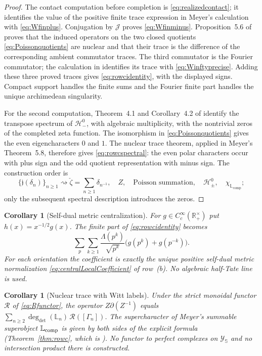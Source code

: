 \documentclass[11pt]{amsart}
\newtheorem{corollary}[theorem]{Corollary}
\theoremstyle{definition}
\theoremstyle{remark}
\newcommand{\R}{\mathbb R}
\begin{document}
\begin{proof}
The contact computation before completion is
\eqref{eq:realizedcontact}; it identifies the value of the positive finite
trace expression in Meyer's calculation with \eqref{eq:Wfinplus}.
Conjugation by
$\mathscr J$ proves \eqref{eq:Wfinminus}.  Proposition~5.6 of
\cite{MeyerZeta} proves that the induced operators on the two closed
quotients \eqref{eq:Poissonquotients} are nuclear and that their trace is
the difference of the corresponding ambient commutator traces.  The third
commutator is the Fourier commutator; the calculation in
\cite[Theorem~5.8 and its proof]{MeyerZeta} identifies its trace with
\eqref{eq:Winftyprecise}.  Adding these three proved traces gives
\eqref{eq:rowcidentity}, with the displayed signs.  Compact support handles
the finite sums and the Fourier finite part handles the unique
archimedean singularity.

For the second computation, Theorem~4.1 and Corollary~4.2 of
\cite{MeyerZeta} identify the transpose spectrum of $\mathcal H_-^0$, with
algebraic multiplicity, with the nontrivial zeros of the completed zeta
function.  The isomorphism in \eqref{eq:Poissonquotients} gives the even
eigencharacters $0$ and $1$.  The nuclear trace theorem, applied in
Meyer's Theorem~5.8, therefore gives \eqref{eq:rowcspectral}: the even polar
characters occur with plus sign and the odd quotient representation with
minus sign.  The construction order is
\[
 \{\mathfrak j(\delta_n)\}_{n\geq1}
 \rightsquigarrow\check\zeta=\sum_{n\geq1}\delta_{n^{-1}},\quad
 Z,\quad \text{Poisson summation},\quad
 \mathcal H_\pm^0,\quad\chi_{\mathbb L_{\mathrm{comp}}};
\]
only the subsequent spectral description introduces the zeros.
\end{proof}

\begin{corollary}[Self-dual metric centralization]
\label{cor:rowccentral}
For $g\in C_c^\infty(\R_+^\times)$ put $h(x)=x^{-1/2}g(x)$.  The finite
part of \eqref{eq:rowcidentity} becomes
\[
 \sum_p\sum_{k\geq1}\frac{\Lambda(p^k)}{\sqrt{p^k}}
 \bigl(g(p^k)+g(p^{-k})\bigr).
\]
For each orientation the coefficient is exactly the unique positive
self-dual metric normalization \eqref{eq:centralLocalCoefficient} of
row~(b).  No algebraic half-Tate line is used.
\end{corollary}

\begin{corollary}[Nuclear trace with Witt labels]\label{cor:rowccomplete}
Under the strict monoidal functor $\mathcal R$ of \eqref{eq:Rfunctor}, the
operator $Z\partial(Z^{-1})$ equals
$\sum_{n\ge2}\deg_{\det}(\mathbb L_n)\,\mathcal R([\Gamma_n])$.  The
supercharacter of Meyer's summable superobject $\mathbb L_{\rm comp}$ is
given by both sides of the explicit formula (Theorem~\ref{thm:rowc}, which
is \cite[Theorem~5.8]{MeyerZeta}).  No functor to perfect complexes on
$\mathscr Y_{\mathbb S}$ and no intersection product there is constructed.
\end{corollary}
\end{document}
